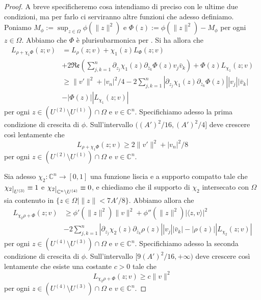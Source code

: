 \begin{proof}
    A breve specificheremo cosa intendiamo di preciso con le ultime due condizioni, ma per farlo ci serviranno altre funzioni che adesso definiamo. Poniamo $M_\phi:=\displaystyle\sup_{z\in\Omega}\phi(\|z\|^2)$ e $\Phi(z):=\phi(\|z\|^2)-M_\phi$ per ogni $z\in\Omega$. Abbiamo che $\Phi$ è plurisubarmonica per \cite[Proposition 2.2.6]{Kr}. Si ha allora che
    \begin{align*}
        L_{\rho+\chi_1\Phi}(z;v)&=L_\rho(z;v)+\chi_1(z)L_\Phi(z;v)\\
        &+2\mathfrak{Re}\left(\sum_{j,k=1}^n\partial_{z_j}\chi_1(z)\partial_{\bar{z}_k}\Phi(z)v_j\bar{v}_k\right)+\Phi(z)L_{\chi_1}(z;v)\\
        &\ge \|v'\|^2+|v_n|^2/4-2\sum_{j,k=1}^n|\partial_{z_j}\chi_1(z)\partial_{\bar{z}_k}\Phi(z)||v_j||\bar{v}_k|\\
        &-|\Phi(z)||L_{\chi_1}(z;v)|
    \end{align*}
    per ogni $z\in(U^{(2)}\setminus U^{(1)})\cap\Omega$ e $v\in\mathbb{C}^n$. Specifichiamo adesso la prima condizione di crescita di $\phi$. Sull'intervallo $((A')^2/16,(A')^2/4]$ deve crescere così lentamente che
    $$L_{\rho+\chi_1\Phi}(z;v)\ge 2\|v'\|^2+|v_n|^2/8$$
    per ogni $z\in(U^{(2)}\setminus U^{(1)})\cap\Omega$ e $v\in\mathbb{C}^n$.

    Sia adesso $\chi_2:\mathbb{C}^n\longrightarrow[0,1]$ una funzione liscia e a supporto compatto tale che $\chi_2\restrict{U^{(3)}}\equiv1$ e $\chi_2\restrict{\mathbb{C}^n\setminus{U^{(4)}}}\equiv 0$, e chiediamo che il supporto di $\chi_2$ intersecato con $\Omega$ sia contenuto in $\{z\in\Omega\mid \|z\|<7A'/8\}$. Abbiamo allora che
    \begin{align*}
        L_{\chi_2\rho+\Phi}(z;v)&\ge \phi'(\|z\|^2)\|v\|^2+\phi''(\|z\|^2)|\langle z,v\rangle|^2\\
        &-2\sum_{j,k=1}^n|\partial_{z_j}\chi_2(z)\partial_{\bar{z}_k}\rho(z)||v_j||\bar{v}_k|-|\rho(z)||L_{\chi_2}(z;v)|
    \end{align*}
    per ogni $z\in(U^{(4)}\setminus U^{(3)})\cap\Omega$ e $v\in\mathbb{C}^n$. Specifichiamo adesso la seconda condizione di crescita di $\phi$. Sull'intervallo $[9(A')^2/16,+\infty)$ deve crescere così lentamente che esiste una costante $c>0$ tale che
    $$L_{\chi_2\rho+\Phi}(z;v)\ge c\|v\|^2$$
    per ogni $z\in(U^{(4)}\setminus U^{(3)})\cap\Omega$ e $v\in\mathbb{C}^n$.


\end{proof}
